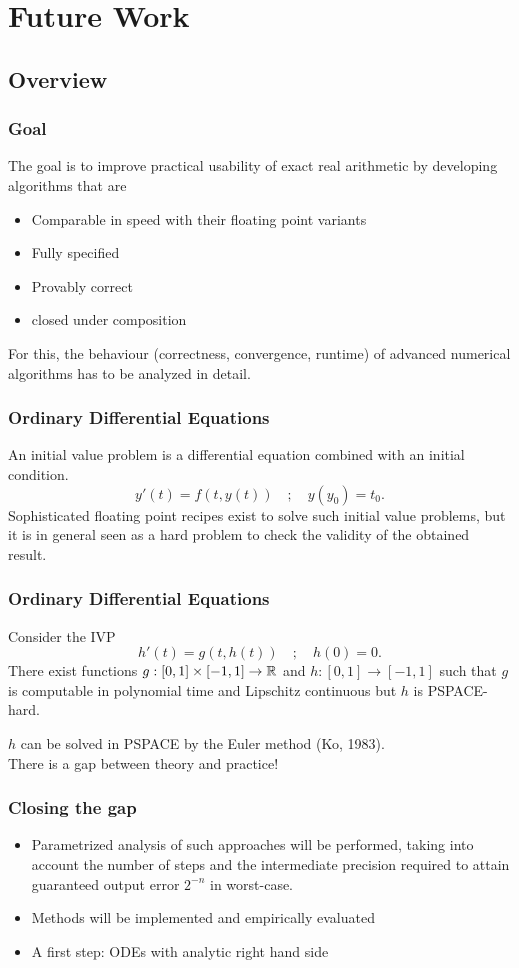 \section{Future Work}
\subsection{Overview}
\begin{frame}[<+->]
\frametitle{Goal}
The goal is to improve practical usability of exact real arithmetic by developing algorithms that are
\pause
\begin{itemize}
	\item Comparable in speed with their floating point variants
	\item Fully specified
	\item Provably correct
	\item closed under composition
\end{itemize}
\pause
For this, the behaviour (correctness, convergence, runtime) of advanced numerical algorithms has to be analyzed in detail. 
\end{frame}
\begin{frame}[<+->]
\frametitle{Ordinary Differential Equations}
An initial value problem is a differential equation combined with an initial 
condition.
$$
y'(t)=f(t,y(t)) \quad;\quad y(y_0)=t_0.
$$
\pause
Sophisticated floating point recipes exist to solve such initial value problems, but it is in general seen as a 
hard problem to check the validity of the obtained result.
\end{frame}
\begin{frame}
\frametitle{Ordinary Differential Equations}
\begin{theorem}[Kawamura, 2010]
Consider the IVP
$$
h'(t)=g(t,h(t)) \quad;\quad h(0)=0.
$$
\pause
There exist functions $g: [0,1] \times [-1,1] \to \mathbb{R}$ and $h: [0,1] \to [-1,1]$
such that $g$ is computable in polynomial time and Lipschitz continuous
but $h$ is PSPACE-hard.
\end{theorem}
\pause
$h$ can be solved in PSPACE by the Euler method (Ko, 1983).\\
There is a gap between theory and practice!
\end{frame}
\begin{frame}[<+->]
\frametitle{Closing the gap}
\begin{itemize}
	\item Parametrized analysis of such approaches will be performed, taking
into account the number of steps and the intermediate precision required to attain guaranteed
output error $2^{-n}$ in worst-case.
	\item Methods will be implemented and empirically evaluated
	\item A first step: ODEs with analytic right hand side
\end{itemize}
\end{frame}